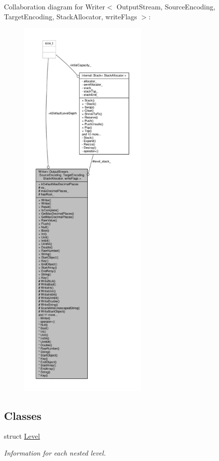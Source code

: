 Collaboration diagram for Writer$<$ Output\+Stream, Source\+Encoding, Target\+Encoding, Stack\+Allocator, write\+Flags $>$\+:
\nopagebreak
\begin{figure}[H]
\begin{center}
\leavevmode
\includegraphics[height=550pt]{classWriter__coll__graph}
\end{center}
\end{figure}
\subsection*{Classes}
\begin{DoxyCompactItemize}
\item 
struct \hyperlink{structWriter_1_1Level}{Level}
\begin{DoxyCompactList}\small\item\em Information for each nested level. \end{DoxyCompactList}\end{DoxyCompactItemize}
